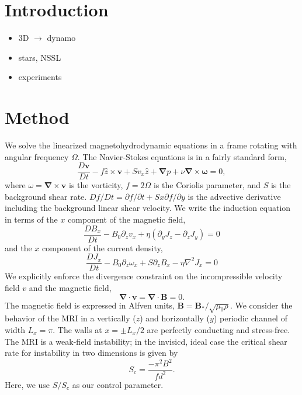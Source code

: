 \documentclass[aps,prl,reprint,groupedaddress]{revtex4-1}
\newcommand{\SSC}{S/S_{c}}
\begin{document}
\section{Introduction}
\label{sec:intro}

\begin{itemize}
\item 3D $\to$ dynamo
\item stars, NSSL
\item experiments
\end{itemize}

\section{Method}
\label{sec:method}

We solve the linearized magnetohydrodynamic equations in a frame rotating with angular frequency $\Omega$. The Navier-Stokes equations is in a fairly standard form,
\begin{equation}
  \label{eq:ns}
  \frac{D \mathbf{v}}{Dt} - f \hat{z} \times \mathbf{v} + S v_x \hat{z} + \mathbf{\nabla}{p} + \nu \mathbf{\nabla} \times \mathbf{\omega} = 0,
\end{equation}
where $\omega = \mathbf{\nabla} \times \mathbf{v}$ is the vorticity, $f = 2 \Omega$ is the Coriolis parameter, and $S$ is the background shear rate. $Df/Dt = \partial f/\partial t + S x \partial f/\partial y$ is the advective derivative including the background linear shear velocity.  We write the induction equation in terms of the $x$ component of the magnetic field,
\begin{equation}
  \label{eq:Bx}
  \frac{D B_x}{Dt} - B_0 \partial_z v_x + \eta (\partial_y J_z - \partial_z J_y) = 0
\end{equation}
and the $x$ component of the current density,
\begin{equation}
  \label{eq:Jx}
  \frac{D J_x}{Dt} - B_0 \partial_z \omega_x + S \partial_z B_x - \eta \nabla^2 J_x = 0
\end{equation}
We explicitly enforce the divergence constraint on the incompressible velocity field $v$ and the magnetic field,
\begin{equation}
  \label{eq:divu}
  \mathbf{\nabla} \cdot \mathbf{v} = \mathbf{\nabla} \cdot \mathbf{B} = 0.
\end{equation}
The magnetic field is expressed in Alfven units, $\mathbf{B} = \mathbf{B_*}/\sqrt{\mu_0 \rho}$.
We consider the behavior of the MRI in a vertically ($z$) and horizontally ($y$) periodic channel of width $L_x = \pi$. The walls at $x = \pm L_x/2$ are perfectly conducting and stress-free. The MRI is a weak-field instability; in the invisicd, ideal case the critical shear rate for instability in two dimensions is given by
\begin{equation}
  \label{eq:Sc}
  S_c = \frac{-\pi^2 B^2}{f d^2}.
\end{equation}
Here, we use $\SSC$ as our control parameter. 
\end{document}
